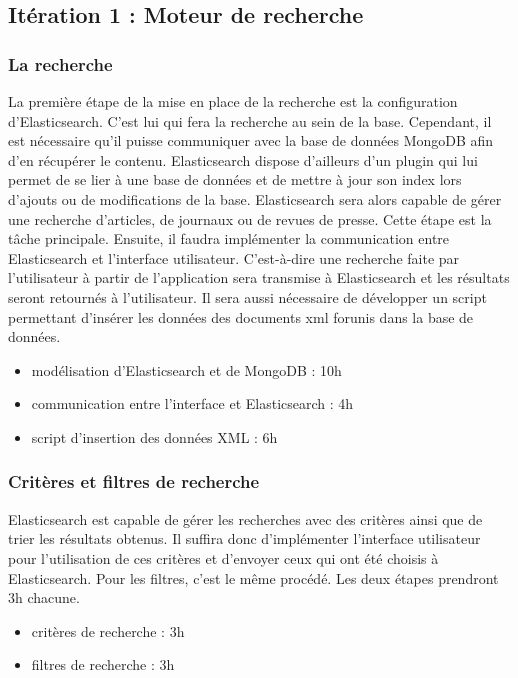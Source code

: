 \subsection{Itération 1 : Moteur de recherche}
\label{sec:moteur_rech}
	\subsubsection{La recherche} 
	\label{subsec:recherche}
		La première étape de la mise en place de la recherche est la configuration d'Elasticsearch. C'est lui qui fera la recherche au sein de la base. Cependant, il est nécessaire qu'il puisse communiquer avec la base de données MongoDB afin d'en récupérer le contenu. Elasticsearch dispose d'ailleurs d'un plugin qui lui permet de se lier à une base de données et de mettre à jour son index lors d'ajouts ou de modifications de la base. Elasticsearch sera alors capable de gérer une recherche d'articles, de journaux ou de revues de presse. Cette étape est la tâche principale. Ensuite, il faudra implémenter la communication entre Elasticsearch et l'interface utilisateur. C'est-à-dire une recherche faite par l'utilisateur à partir de l'application sera transmise à Elasticsearch et les résultats seront retournés à l'utilisateur. Il sera aussi nécessaire de développer un script permettant d'insérer les données des documents xml forunis dans la base de données.

		\begin{itemize}
			\item modélisation d'Elasticsearch et de MongoDB : 10h
			\item communication entre l'interface et Elasticsearch : 4h
			\item script d'insertion des données XML : 6h
		\end{itemize}

	\subsubsection{Critères et filtres de recherche} 
	\label{subsec:crit_filtre}
		Elasticsearch est capable de gérer les recherches avec des critères ainsi que de trier les résultats obtenus. Il suffira donc d'implémenter l'interface utilisateur pour l'utilisation de ces critères et d'envoyer ceux qui ont été choisis à Elasticsearch. Pour les filtres, c'est le même procédé. Les deux étapes prendront 3h chacune.

		\begin{itemize}
			\item critères de recherche : 3h
			\item filtres de recherche : 3h
		\end{itemize}

